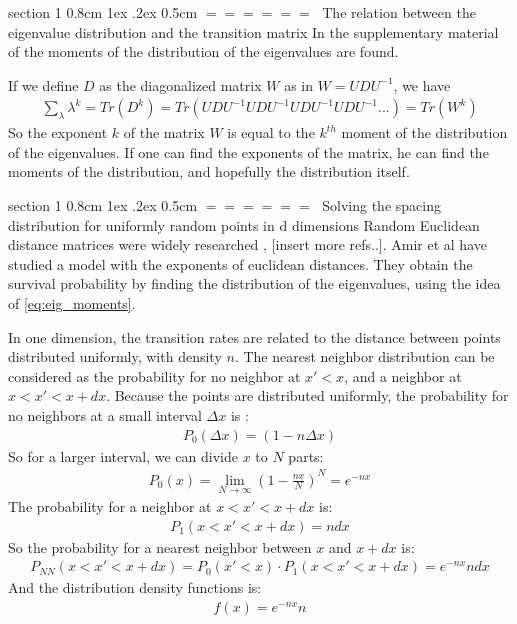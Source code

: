 \documentclass[onecolumn,fleqn,notitlepage,secnumarabic]{revtex4}
\makeatletter
\def\section{%
  \@startsection
    {section}%
    {1}%
    {\z@}%
    {0.8cm \@plus1ex \@minus .2ex}%
    {0.5cm}%
    {\Large\bf $=\!=\!=\!=\!=\!=\;$}%
}%
\makeatother
\begin{document}
\section{The relation between the eigenvalue distribution and the transition matrix}
In the supplementary material of \cite{Amir:2010:PRL} the moments of the distribution of the eigenvalues are found. 

If we define $D$ as the diagonalized matrix $W$ as in $W=UDU^{-1}$, we have
\begin{align}\label{eq:eig_moments}
\sum_\lambda \lambda^k = Tr (D^k) = Tr(UDU^{-1}UDU^{-1}UDU^{-1}UDU^{-1}...) = Tr (W^k)
\end{align}
So the exponent $k$ of the matrix $W$ is equal to the $k^{th}$ moment of the distribution of the eigenvalues. If one can find the exponents of the matrix, he can find the moments of the distribution, and hopefully the distribution itself. 


\section{Solving the spacing distribution for uniformly random points in d dimensions} \label{subsec:euclid}
Random Euclidean distance matrices were widely researched \cite{Mezard:1999:NPB}, [insert more refs..]. Amir et al \cite{Amir:2010:PRL} have studied a model with the exponents of euclidean distances. They obtain the survival probability by finding the distribution of the eigenvalues, using the idea of \ref{eq:eig_moments}. 

In one dimension, the transition rates are related to the distance between points distributed uniformly, with density $n$. The nearest neighbor distribution can be considered as the probability for no neighbor at $x'<x$, and a neighbor at $x<x'<x+dx$. Because the points are distributed uniformly, the probability for no neighbors at a small interval $\Delta x$ is :
\begin{align}P_0(\Delta x) = (1-n\Delta x) \end{align}
So for a larger interval, we can divide $x$ to $N$ parts:
\begin{align}P_0(x) = \lim_{N\rightarrow \infty}(1-\frac{nx}{N})^N = e^{-n x} \end{align}
The probability for a neighbor at $x<x'<x+dx$ is:
\begin{align}P_1(x<x'<x+dx) = n dx \end{align}
So the probability for a nearest neighbor between $x$ and $x+dx$ is:
\begin{align}P_{NN}(x< x'<x+dx) = P_0(x'<x)\cdot P_1(x<x'<x+dx) = e^{-n x}ndx \end{align}
And the distribution density functions is:
\begin{align} f(x) = e^{-n x}n\end{align}
\end{document}
